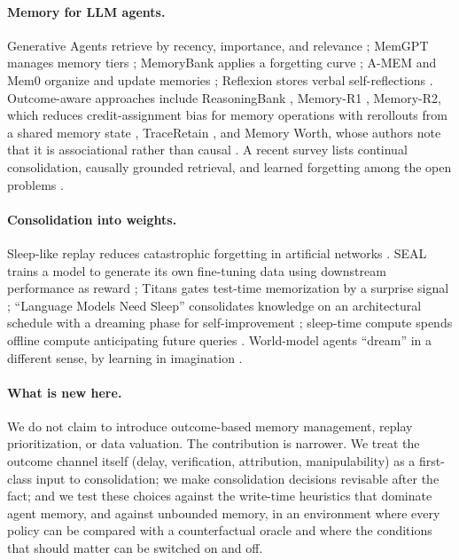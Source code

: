 \documentclass[11pt]{article}
\begin{document}
\paragraph{Memory for LLM agents.} Generative Agents retrieve by recency, importance, and relevance \citep{park2023}; MemGPT manages memory tiers \citep{packer2023}; MemoryBank applies a forgetting curve \citep{zhong2024memorybank}; A-MEM and Mem0 organize and update memories \citep{xu2025amem,chhikara2025mem0}; Reflexion stores verbal self-reflections \citep{shinn2023}. Outcome-aware approaches include ReasoningBank \citep{ouyang2025reasoningbank}, Memory-R1 \citep{yan2025memoryr1}, Memory-R2, which reduces credit-assignment bias for memory operations with rerollouts from a shared memory state \citep{yan2026memoryr2}, TraceRetain \citep{reddy2026traceretain}, and Memory Worth, whose authors note that it is associational rather than causal \citep{simsek2026worth}. A recent survey lists continual consolidation, causally grounded retrieval, and learned forgetting among the open problems \citep{du2026survey}.

\paragraph{Consolidation into weights.} Sleep-like replay reduces catastrophic forgetting in artificial networks \citep{tadros2022}. SEAL trains a model to generate its own fine-tuning data using downstream performance as reward \citep{zweiger2025seal}; Titans gates test-time memorization by a surprise signal \citep{behrouz2024titans}; ``Language Models Need Sleep'' consolidates knowledge on an architectural schedule with a dreaming phase for self-improvement \citep{behrouz2026sleep}; sleep-time compute spends offline compute anticipating future queries \citep{lin2025sleeptime}. World-model agents ``dream'' in a different sense, by learning in imagination \citep{hafner2020dreamer}.

\paragraph{What is new here.} We do not claim to introduce outcome-based memory management, replay prioritization, or data valuation. The contribution is narrower. We treat the outcome channel itself (delay, verification, attribution, manipulability) as a first-class input to consolidation; we make consolidation decisions revisable after the fact; and we test these choices against the write-time heuristics that dominate agent memory, and against unbounded memory, in an environment where every policy can be compared with a counterfactual oracle and where the conditions that should matter can be switched on and off.
\end{document}
